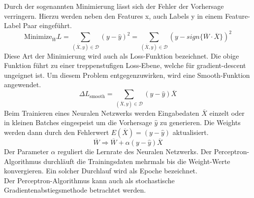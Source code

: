 \noindent 
Durch der sogenannten Minimierung lässt sich der Fehler der Vorhersage verringern. Hierzu werden neben den Features x, auch Labels y in einem Feature-Label Paar eingeführt. 
$$\text{Minimize}_{\overline{W}}L = \sum\limits_{(\overline{X},y)\in \mathcal{D}}(y - \hat{y})^2 = \sum\limits_{(\overline{X},y)\in \mathcal{D}}(y - sign\{\overline{W} \cdot \overline{X}\})^2$$
Diese Art der Minimierung wird auch als Loss-Funktion bezeichnet. Die obige Funktion führt zu einer treppenstufigen Loss-Ebene, welche für gradient-descent ungeignet ist. Um diesem Problem entgegenzuwirken, wird eine Smooth-Funktion angewendet.
$$\Delta L_{\text{smooth}} = \sum\limits_{(\overline{X},y)\in \mathcal{D}}(y - \hat{y})\overline{X}$$
Beim Trainieren eines Neuralen Netzwerks werden Eingabedaten $\overline{X}$ einzelt oder in kleinen Batches eingespeist um die Vorhersage $\hat{y}$ zu generieren. Die Weights werden dann durch den Fehlerwert $E(\overline{X}) = (y - \hat{y})$ aktualisiert.
$$\overline{W} \Rightarrow \overline{W} + \alpha(y - \hat{y})\overline{X}$$
Der Parameter $\alpha$ reguliert die Lernrate des Neuralen Netzwerks. Der Perceptron-Algorithmus durchläuft die Trainingsdaten mehrmals bis die Weight-Werte konvergieren. Ein solcher Durchlauf wird als Epoche bezeichnet.\\
Der Perceptron-Algorithmus kann auch als stochastische Gradientenabstiegsmethode betrachtet werden. \cite{CA18}